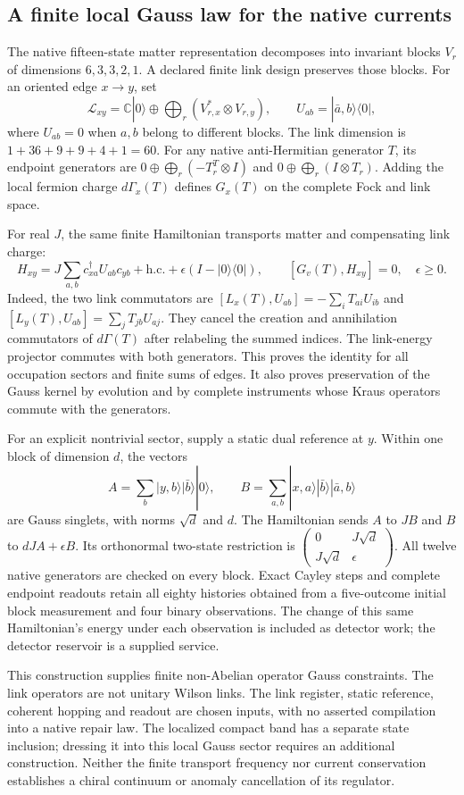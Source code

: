 \subsection{A finite local Gauss law for the native currents}
\label{sec:native-quantum-gauss}

The native fifteen-state matter representation decomposes into invariant
blocks $V_r$ of dimensions $6,3,3,2,1$. A declared finite link design
preserves those blocks. For an oriented edge $x\to y$, set
\[
 \mathcal L_{xy}=\mathbb C|0\rangle\oplus
       \bigoplus_r(V_{r,x}^*\otimes V_{r,y}),
 \qquad U_{ab}=|\bar a,b\rangle\langle0|,
\]
where $U_{ab}=0$ when $a,b$ belong to different blocks. The link dimension
is $1+36+9+9+4+1=60$. For any native anti-Hermitian generator $T$, its
endpoint generators are $0\oplus\bigoplus_r(-T_r^T\otimes I)$ and
$0\oplus\bigoplus_r(I\otimes T_r)$. Adding the local fermion charge
$d\Gamma_x(T)$ defines $G_x(T)$ on the complete Fock and link space.

For real $J$, the same finite Hamiltonian transports matter and compensating
link charge:
\[
 H_{xy}=J\sum_{a,b}c_{xa}^\dagger U_{ab}c_{yb}
         +\mathrm{h.c.}+\epsilon(I-|0\rangle\langle0|),
 \qquad [G_v(T),H_{xy}]=0,\quad\epsilon\geq0.
\]
Indeed, the two link commutators are
$[L_x(T),U_{ab}]=-\sum_iT_{ai}U_{ib}$ and
$[L_y(T),U_{ab}]=\sum_jT_{jb}U_{aj}$. They cancel the creation and
annihilation commutators of $d\Gamma(T)$ after relabeling the summed
indices. The link-energy projector commutes with both generators.
This proves the identity for all occupation sectors and finite sums of
edges. It also proves preservation of the Gauss kernel by evolution and
by complete instruments whose Kraus operators commute with the generators.

For an explicit nontrivial sector, supply a static dual reference at $y$.
Within one block of dimension $d$, the vectors
\[
 A=\sum_b|y,b\rangle|\bar b\rangle|0\rangle,
 \qquad B=\sum_{a,b}|x,a\rangle|\bar b\rangle|\bar a,b\rangle
\]
are Gauss singlets, with norms $\sqrt d$ and $d$.
The Hamiltonian sends $A$ to $JB$ and $B$ to $dJA+\epsilon B$.
Its orthonormal two-state restriction is
$\left(\begin{smallmatrix}0&J\sqrt d\\J\sqrt d&\epsilon\end{smallmatrix}\right)$.
All twelve native generators are checked on every block. Exact Cayley
steps and complete endpoint readouts retain all eighty histories obtained
from a five-outcome initial block measurement and four binary observations.
The change of this same Hamiltonian's energy under each observation is
included as detector work; the detector reservoir is a supplied service.

This construction supplies finite non-Abelian operator Gauss constraints.
The link operators are not unitary Wilson links. The link register, static
reference, coherent hopping and readout are chosen inputs, with no asserted
compilation into a native repair law. The localized compact band has a separate
state inclusion; dressing it into this local Gauss sector requires an
additional construction. Neither the finite transport frequency nor
current conservation establishes a chiral continuum or anomaly cancellation
of its regulator.
